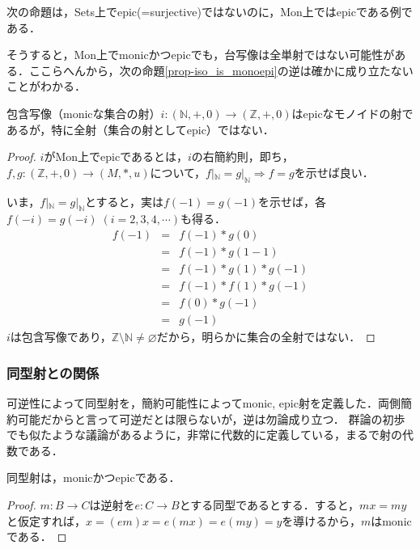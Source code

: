 \documentclass[uplatex, 12pt, dvipdfmx]{jsarticle}
\begin{document}
\begin{example}\label{example-epis-notnecessarily-surjective}
    次の命題は，Sets上でepic(=surjective)ではないのに，Mon上ではepicである例である．

    そうすると，Mon上でmonicかつepicでも，台写像は全単射ではない可能性がある．ここらへんから，次の命題\ref{prop-iso_is_monoepi}の逆は確かに成り立たないことがわかる．
    \begin{proposition*}
        包含写像（monicな集合の射）$i:(\mathbb{N},+,0)\to(\mathbb{Z},+,0)$はepicなモノイドの射であるが，特に全射（集合の射としてepic）ではない．
    \end{proposition*}
    \begin{proof}
        $i$がMon上でepicであるとは，$i$の右簡約則，即ち，$f,g:(\mathbb{Z},+,0)\to (M,*,u)$について，$f|_\mathbb{N}=g|_\mathbb{N}\Rightarrow f=g$を示せば良い．

        いま，$f|_\mathbb{N}=g|_\mathbb{N}$とすると，実は$f(-1)=g(-1)$を示せば，各$f(-i)=g(-i)\; (i=2,3,4,\cdots)$も得る．
        \begin{eqnarray*}
            f(-1) &=& f(-1)*g(0) \\
            &=& f(-1)*g(1-1) \\
            &=& f(-1)*g(1)*g(-1) \\
            &=& f(-1)*f(1)*g(-1) \\
            &=& f(0)*g(-1) \\
            &=& g(-1)
        \end{eqnarray*}
        $i$は包含写像であり，$\mathbb{Z}\setminus\mathbb{N}\ne\varnothing$だから，明らかに集合の全射ではない．
    \end{proof}
\end{example}

\subsubsection*{同型射との関係}

可逆性によって同型射を，簡約可能性によってmonic, epic射を定義した．両側簡約可能だからと言って可逆だとは限らないが，逆は勿論成り立つ．
群論の初歩でも似たような議論があるように，非常に代数的に定義している，まるで射の代数である．
\begin{proposition}[可逆な射は簡約可能である]\label{prop-iso_is_monoepi}
    同型射は，monicかつepicである．
\end{proposition}
\begin{proof}
    $m:B\to C$は逆射を$e:C\to B$とする同型であるとする．すると，$mx=my$と仮定すれば，$x=(em)x=e(mx)=e(my)=y$を導けるから，$m$はmonicである．
\end{proof}
\end{document}

